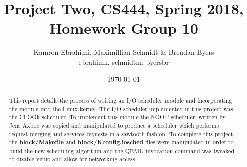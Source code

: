 \documentclass[10pt,onecolumn,draftclsnofoot]{IEEEtran} %
\title{ Project Two, CS444, Spring 2018, Homework Group 10}
\author{Kamron Ebrahimi, Maximillian Schmidt \& Brendan Byers \\ ebrahimk, schmidtm, byersbr }
\date{\today}
\begin{document}
\begin{titlingpage}
\maketitle
\begin{abstract}
\begin{singlespace}
This report details the process of writing an I/O scheduler module and incorperating the module into the Linux kernel. The I/O scheduler implemented in this project was the CLOOk scheduler. To implement this module the NOOP scheduler, written by Jens Axboe was copied and manipulated to produce a scheduler which performs request merging and services requests in a sawtooth fashion. To complete this project the \textbf{block/Makefile} and \textbf{block/Kconfig.iosched} files were manipulated in order to build the new scheduling algorithm and the QEMU invocation command was tweaked to disable virtio and allow for networking access.
\end{singlespace}
\end{abstract}
\end{titlingpage}


\tableofcontents
\end{document}
